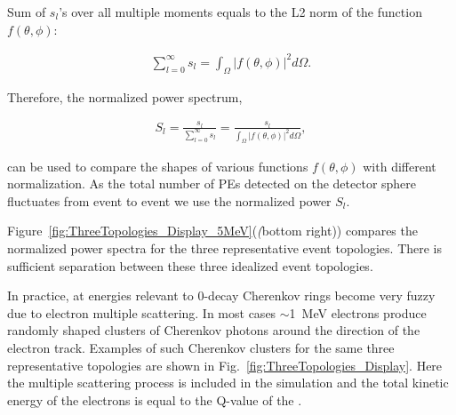 Sum of $s_l$'s over all multiple moments equals to the L2 norm of the function $f(\theta,\phi)$:

\begin{eqnarray}
\label{eq5}
\sum_{l=0}^{\infty} s_l = \int_{\Omega} |f(\theta,\phi)|^2 d\Omega.
\end{eqnarray}

Therefore, the normalized power spectrum,

\begin{eqnarray}
\label{eq6}
S_l = \frac{s_l}{\sum_{l=0}^{\infty} s_l} =  \frac{s_l}{\int_{\Omega} |f(\theta,\phi)|^2 d\Omega},
\end{eqnarray}

can be used to compare the shapes of various functions $f(\theta,\phi)$ with different normalization. As the total number of PEs detected on the detector sphere fluctuates from event to event we use the normalized power $S_l$.

Figure~\ref{fig:ThreeTopologies_Display_5MeV}(\emph(bottom right)) compares the normalized power spectra for the three representative event topologies.
There is sufficient separation between these three idealized event topologies.

In practice, at energies relevant to 0\nbb-decay Cherenkov rings become very fuzzy due to electron multiple scattering. In most cases $\sim$1~MeV 
electrons produce randomly shaped clusters of Cherenkov photons around the direction of the electron track. Examples of such Cherenkov clusters
for the same three representative topologies are shown in Fig.~\ref{fig:ThreeTopologies_Display}. Here the multiple scattering process is included 
in the simulation and the total kinetic energy of the electrons is equal to the Q-value of the \Te.


